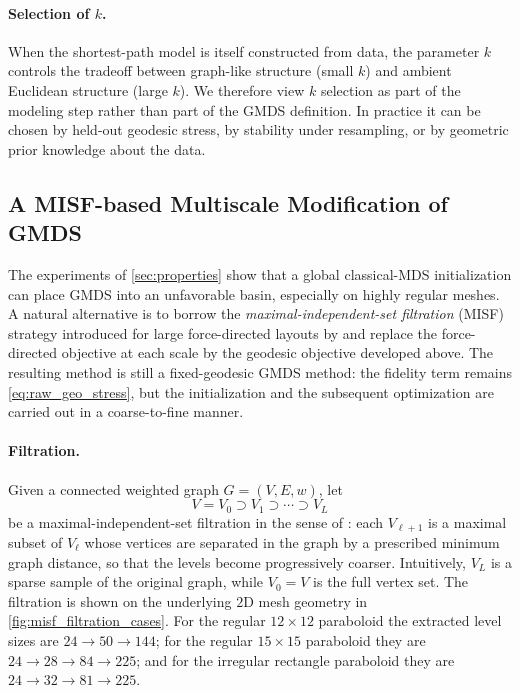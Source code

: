 \documentclass[11pt]{article}
\theoremstyle{definition}
\theoremstyle{plain}
\theoremstyle{remark}
\begin{document}
\paragraph{Selection of $k$.}
When the shortest-path model is itself constructed from data, the parameter $k$
controls the tradeoff between graph-like structure (small $k$) and ambient
Euclidean structure (large $k$).  We therefore view $k$ selection as part of
the modeling step rather than part of the GMDS definition.  In practice it can
be chosen by held-out geodesic stress, by stability under resampling, or by
geometric prior knowledge about the data.

\subsection{A MISF-based Multiscale Modification of GMDS}
\label{sec:misf_gmds}

The experiments of \cref{sec:properties} show that a global classical-MDS
initialization can place GMDS into an unfavorable basin, especially on highly
regular meshes.  A natural alternative is to borrow the
\emph{maximal-independent-set filtration} (MISF) strategy introduced for large
force-directed layouts by \citet{gajer2004multidimensional,gajer2002grip} and
replace the force-directed objective at each scale by the geodesic objective
developed above.  The resulting method is still a fixed-geodesic GMDS method:
the fidelity term remains \cref{eq:raw_geo_stress}, but the initialization and
the subsequent optimization are carried out in a coarse-to-fine manner.

\paragraph{Filtration.}
Given a connected weighted graph $G=(V,E,w)$, let
\[
  V = V_0 \supset V_1 \supset \cdots \supset V_L
\]
be a maximal-independent-set filtration in the sense of
\citet{gajer2004multidimensional,gajer2002grip}: each $V_{\ell+1}$ is a maximal
subset of $V_\ell$ whose vertices are separated in the graph by a prescribed
minimum graph distance, so that the levels become progressively coarser.
Intuitively, $V_L$ is a sparse sample of the original graph, while $V_0=V$ is
the full vertex set.  The filtration is shown on the underlying $2$D mesh
geometry in \cref{fig:misf_filtration_cases}.  For the regular $12\times 12$
paraboloid the extracted level sizes are $24 \rightarrow 50 \rightarrow 144$;
for the regular $15\times 15$ paraboloid they are
$24 \rightarrow 28 \rightarrow 84 \rightarrow 225$; and for the irregular
rectangle paraboloid they are $24 \rightarrow 32 \rightarrow 81 \rightarrow
225$.
\end{document}
